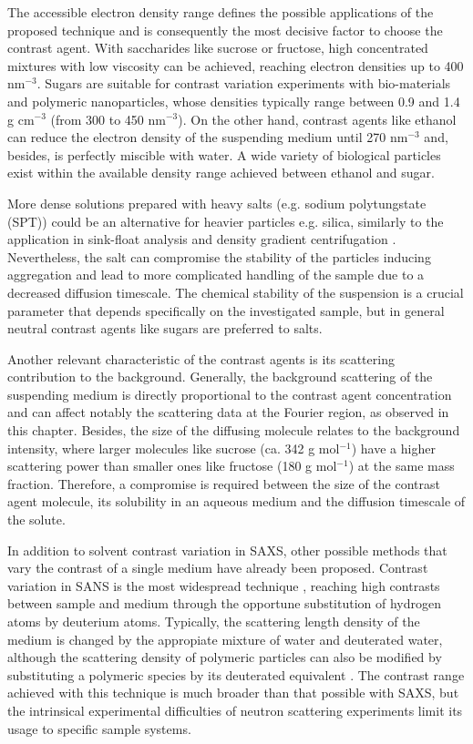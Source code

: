 The accessible electron density range defines the possible applications of the proposed technique and is consequently the most decisive factor to choose the contrast agent. With saccharides like sucrose or fructose, high concentrated mixtures with low viscosity can be achieved, reaching electron densities up to 400 nm$^{-3}$. Sugars are suitable for contrast variation experiments with bio-materials and polymeric nanoparticles, whose densities typically range between 0.9 and 1.4 g cm$^{-3}$ (from 300 to 450 nm$^{-3}$). On the other hand, contrast agents like ethanol can reduce the electron density of the suspending medium until 270 nm$^{-3}$ and, besides, is perfectly miscible with water. A wide variety of biological particles exist within the available density range achieved between ethanol and sugar.

More dense solutions prepared with heavy salts (e.g. sodium polytungstate (SPT)) could be an alternative for heavier particles e.g. silica, similarly to the application in sink-float analysis and density gradient centrifugation \citep{rhodes_fine_1991,mitchell_setup_2010}. Nevertheless, the salt can compromise the stability of the particles inducing aggregation and lead to more complicated handling of the sample due to a decreased diffusion timescale. The chemical stability of the suspension is a crucial parameter that depends specifically on the investigated sample, but in general neutral contrast agents like sugars are preferred to salts.

Another relevant characteristic of the contrast agents is its scattering  contribution to the background. Generally, the background scattering of the suspending medium is directly proportional to the contrast agent concentration and can affect notably the scattering data at the Fourier region, as observed in this chapter. Besides, the size of the diffusing molecule relates to the background intensity, where larger molecules like sucrose (ca. 342 g mol$^{-1}$) have a higher scattering power than smaller ones like fructose (180 g mol$^{-1}$) at the same mass fraction. Therefore, a compromise  is required between the size of the contrast agent molecule, its solubility in an aqueous medium and the diffusion timescale of the solute.

In addition to solvent contrast variation in SAXS, other possible methods that vary the contrast of a single medium have already been proposed. Contrast variation in SANS is the most widespread technique \citep{ballauff_analysis_2011, ballauff_saxs_2001-1}, reaching high contrasts between sample and medium through the opportune substitution of hydrogen atoms by deuterium atoms. Typically, the scattering length density of the medium is changed by the appropiate mixture of water and deuterated water, although the scattering density of polymeric particles can also be modified by substituting a polymeric species by its deuterated equivalent \citep{rosenfeldt_distribution_2002}. The contrast range achieved with this technique is much broader than that possible with SAXS, but the intrinsical experimental difficulties of neutron scattering experiments limit its usage to specific sample systems.

